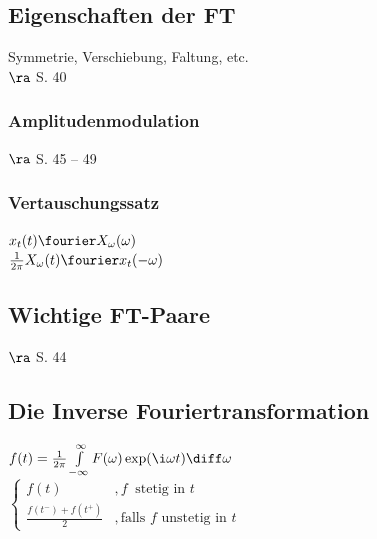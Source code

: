 \documentclass[6pt,a4paper]{scrartcl}
\begin{document}
\begin{multicols}{4}
		\subsection*{Eigenschaften der FT}
		Symmetrie, Verschiebung, Faltung, etc.\\
		$\ra$ S. 40
		
			\subsubsection*{Amplitudenmodulation}
			$\ra$ S. 45 -- 49
			
			\subsubsection*{Vertauschungssatz}
			$x_t(t) \fourier X_{\omega}(\omega)$\\
			$\frac{1}{2 \pi} X_{\omega}(t) \fourier x_t(-\omega)$
			
		\subsection*{Wichtige FT-Paare}
		$\ra$ S. 44

%	
%	
%	
	\subsection*{Die Inverse Fouriertransformation}
	$f(t) = \frac{1}{2\pi} \int\limits_{-\infty}^\infty F(\omega) \exp(\i \omega t) \diff \omega$\\
	$\begin{cases} f(t) & ,f\ \text{ stetig in }t \\ \frac{f(t^-) + f(t^+)}{2} & ,\text{falls } f\text{ unstetig in }t \end{cases}$
	

\end{multicols}
\end{document}
